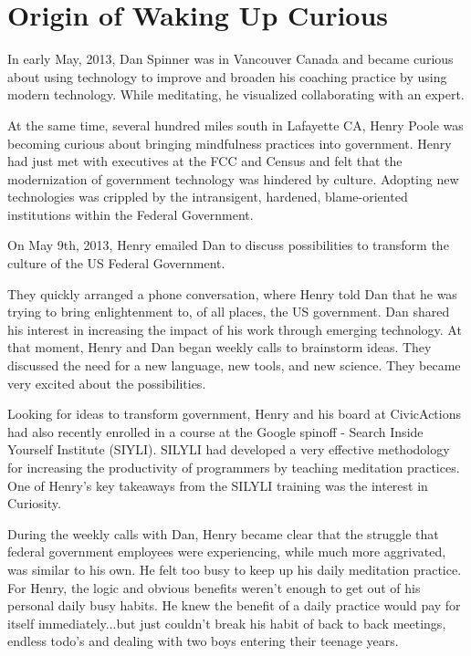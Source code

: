 \documentclass[12pt]{book}
\begin{document}
\chapter{Origin of Waking Up Curious}

In early May, 2013, Dan Spinner was in Vancouver Canada and became
curious about using technology to improve and broaden his coaching
practice by using modern technology. While meditating, he visualized
collaborating with an expert.

At the same time, several hundred miles south in Lafayette CA, Henry
Poole was becoming curious about bringing mindfulness practices into
government. Henry had just met with executives at the FCC and Census
and felt that the modernization of government technology was hindered
by culture. Adopting new technologies was crippled by the
intransigent, hardened, blame-oriented institutions within the Federal
Government.

On May 9th, 2013, Henry emailed Dan to discuss possibilities to
transform the culture of the US Federal Government.

They quickly arranged a phone conversation, where Henry told Dan that
he was trying to bring enlightenment to, of all places, the US
government. Dan shared his interest in increasing the impact of his
work through emerging technology. At that moment, Henry and Dan began
weekly calls to brainstorm ideas. They discussed the need for a new
language, new tools, and new science. They became very excited about
the possibilities.

Looking for ideas to transform government, Henry and his board at
CivicActions had also recently enrolled in a course at the Google
spinoff - Search Inside Yourself Institute (SIYLI). SILYLI had
developed a very effective methodology for increasing the productivity
of programmers by teaching meditation practices. One of Henry's key
takeaways from the SILYLI training was the interest in Curiosity.

During the weekly calls with Dan, Henry became clear that the struggle
that federal government employees were experiencing, while much more
aggrivated, was similar to his own. He felt too busy to keep up his
daily meditation practice. For Henry, the logic and obvious benefits
weren't enough to get out of his personal daily busy habits. He knew
the benefit of a daily practice would pay for itself immediately...but
just couldn't break his habit of back to back meetings, endless todo's
and dealing with two boys entering their teenage years.
\end{document}
